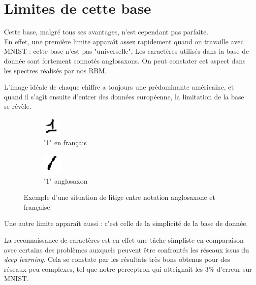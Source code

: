 \documentclass[a4paper,oneside]{report}
\begin{document}
\newpage
            \section{Limites de cette base}

                Cette base, malgré tous ses avantages, n'est cependant pas parfaite.\\

                En effet, une première limite apparaît assez rapidement quand on travaille avec MNIST 
: cette base n'est pas "universelle". Les caractères utilisés dans la base de donnée 
sont fortement connotés 
anglosaxons. On peut constater cet aspect dans les spectres réalisés par nos RBM.

                L'image idéale de chaque chiffre a toujours une prédominante américaine, et quand il 
s'agît ensuite d'entrer des données européenne, la limitation de la base se révèle.\\

                \begin{figure}[!ht]
                    \centering
                    \begin{subfigure}[b]{0.3\textwidth}
                        \centering
                        \includegraphics{Images/mnist-02.png}
                        \caption{"1" en français}
                    \end{subfigure}
                    \hfill
                    \begin{subfigure}[b]{0.3\textwidth}
                        \centering
                        \includegraphics{Images/mnist-03.png}
                        \caption{"1" anglosaxon}
                    \end{subfigure}
                    \caption{Exemple d'une situation de litige entre notation anglosaxone et française.}
                \end{figure}

        Une autre limite apparaît aussi : c'est celle de la simplicité de la base de donnée.

La reconnaissance de caractères est en effet une tâche simpliste en comparaison avec 
certains des problèmes auxquels peuvent être confrontés les réseaux issus du \textit{deep 
learning}. Cela se constate par 
les résultats très bons obtenus pour des réseaux peu complexes, tel que notre perceptron qui 
atteignait les 3\% d'erreur sur MNIST.
\end{document}
